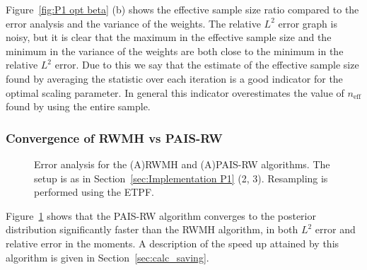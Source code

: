 \documentclass[final]{siamltex}
\newcommand{\neff}{n_{\text{eff}}}
\begin{document}
Figure~\ref{fig:P1 opt beta} (b) shows the effective sample size ratio
compared to the error analysis and the variance of the weights. The
relative $L^2$ error graph is noisy, but it is clear that the maximum
in the effective sample size and the minimum in the variance of the
weights are both close to the minimum in the relative $L^2$ error. Due
to this we say that the estimate of the effective sample size found by
averaging the statistic over each iteration is a good indicator for
the optimal scaling parameter. In general this indicator overestimates
the value of $\neff$ found by using the entire sample.

\subsubsection{Convergence of RWMH vs PAIS-RW}

\begin{figure}[htb]
\centering
{}
\caption{Error analysis for the (A)RWMH and (A)PAIS-RW algorithms. The setup is as in Section~\ref{sec:Implementation P1} (2, 3). Resampling is performed using the ETPF.}
\label{fig:MH1 L2}
\end{figure}

Figure~\ref{fig:MH1 L2} shows that the PAIS-RW algorithm converges to the posterior distribution significantly faster than the RWMH algorithm, in both $L^2$ error and relative error in the moments. A description of the speed up attained by this algorithm is given in Section~\ref{sec:calc_saving}.
\end{document}
